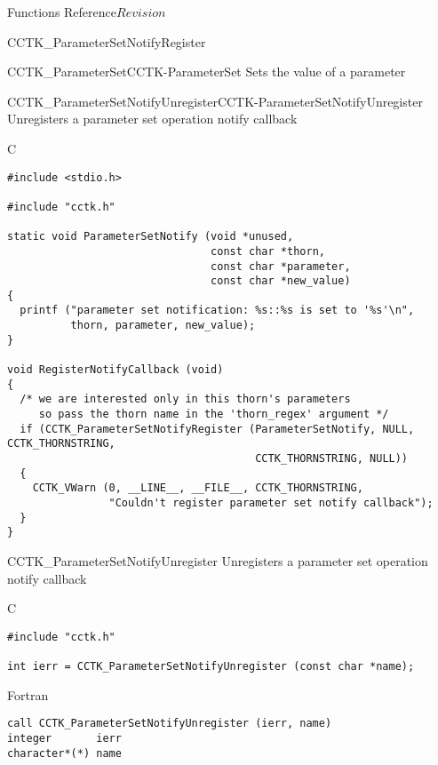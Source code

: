 \begin{cactuspart}{ Functions Reference}{}{$Revision$}
\begin{FunctionDescription}{CCTK\_ParameterSetNotifyRegister}
\begin{SeeAlsoSection}
\begin{SeeAlso2}{CCTK\_ParameterSet}{CCTK-ParameterSet}
  Sets the value of a parameter
\end{SeeAlso2}
\begin{SeeAlso2}{CCTK\_ParameterSetNotifyUnregister}{CCTK-ParameterSetNotifyUnregister}
  Unregisters a parameter set operation notify callback
\end{SeeAlso2}
\end{SeeAlsoSection}

\begin{ExampleSection}
\begin{Example}{C}
\begin{verbatim}
#include <stdio.h>

#include "cctk.h"

static void ParameterSetNotify (void *unused,
                                const char *thorn,
                                const char *parameter,
                                const char *new_value)
{
  printf ("parameter set notification: %s::%s is set to '%s'\n",
          thorn, parameter, new_value);
}

void RegisterNotifyCallback (void)
{
  /* we are interested only in this thorn's parameters
     so pass the thorn name in the 'thorn_regex' argument */
  if (CCTK_ParameterSetNotifyRegister (ParameterSetNotify, NULL, CCTK_THORNSTRING,
                                       CCTK_THORNSTRING, NULL))
  {
    CCTK_VWarn (0, __LINE__, __FILE__, CCTK_THORNSTRING,
                "Couldn't register parameter set notify callback");
  }
}
\end{verbatim}
\end{Example}
\end{ExampleSection}
\end{FunctionDescription}


\begin{FunctionDescription}{CCTK\_ParameterSetNotifyUnregister}
\label{CCTK-ParameterSetNotifyUnregister}
Unregisters a parameter set operation notify callback

\begin{SynopsisSection}
\begin{Synopsis}{C}
\begin{verbatim}
#include "cctk.h"

int ierr = CCTK_ParameterSetNotifyUnregister (const char *name);
\end{verbatim}
\end{Synopsis}
\begin{Synopsis}{Fortran}
\begin{verbatim}
call CCTK_ParameterSetNotifyUnregister (ierr, name)
integer       ierr
character*(*) name
\end{verbatim}
\end{Synopsis}
\end{SynopsisSection}


\end{FunctionDescription}
\end{cactuspart}
